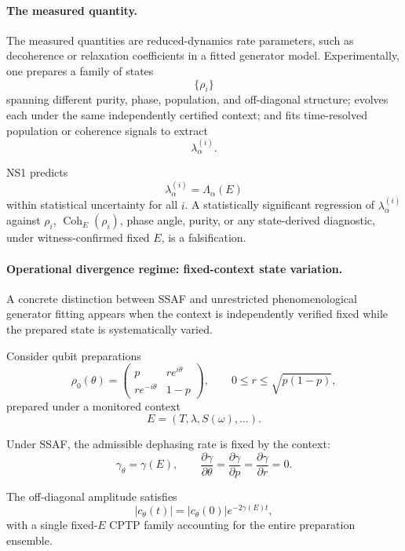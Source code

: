 \documentclass[aps,prx,onecolumn,11pt]{revtex4-2}
\theoremstyle{plain}
\theoremstyle{definition}
\theoremstyle{remark}
\newcommand{\Coh}{\operatorname{Coh}}       %
\begin{document}
\paragraph{The measured quantity.}

The measured quantities are reduced-dynamics rate parameters, such as
decoherence or relaxation coefficients in a fitted generator model.
Experimentally, one prepares a family of states
\[
\{\rho_i\}
\]
spanning different purity, phase, population, and off-diagonal
structure; evolves each under the same independently certified context;
and fits time-resolved population or coherence signals to extract
\[
\lambda_\alpha^{(i)}.
\]

NS1 predicts
\[
\lambda_\alpha^{(i)}
=
\Lambda_\alpha(E)
\]
within statistical uncertainty for all \(i\). A statistically
significant regression of \(\lambda_\alpha^{(i)}\) against
\(\rho_i\), \(\Coh_E(\rho_i)\), phase angle, purity, or any
state-derived diagnostic, under witness-confirmed fixed \(E\), is a
falsification.

\paragraph{Operational divergence regime: fixed-context state variation.}

A concrete distinction between SSAF and unrestricted phenomenological
generator fitting appears when the context is independently verified
fixed while the prepared state is systematically varied.

Consider qubit preparations
\begin{equation}
\rho_0(\theta)
=
\begin{pmatrix}
p & r e^{i\theta}\\
r e^{-i\theta} & 1-p
\end{pmatrix},
\qquad
0\leq r\leq\sqrt{p(1-p)},
\label{eq:ns1_qubit_family}
\end{equation}
prepared under a monitored context
\[
E=(T,\lambda,S(\omega),\ldots).
\]

Under SSAF, the admissible dephasing rate is fixed by the context:
\begin{equation}
\gamma_\theta=\gamma(E),
\qquad
\frac{\partial\gamma}{\partial\theta}
=
\frac{\partial\gamma}{\partial p}
=
\frac{\partial\gamma}{\partial r}
=
0.
\label{eq:ns1_state_independent_rates}
\end{equation}

The off-diagonal amplitude satisfies
\begin{equation}
|c_\theta(t)|
=
|c_\theta(0)|e^{-2\gamma(E)t},
\label{eq:ns1_fixed_context_decay}
\end{equation}
with a single fixed-\(E\) CPTP family accounting for the entire
preparation ensemble.
\end{document}
